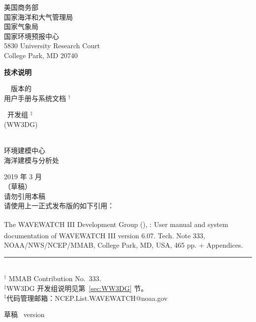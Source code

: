 \pagestyle{empty}

\begin{center}
美国商务部 \\
国家海洋和大气管理局 \\
国家气象局 \\
国家环境预报中心 \\
5830 University Research Court \\
College Park, MD 20740


\vspace{15mm}

{\bf 技术说明}

\vspace{15mm}

{\large \ww\ \WWver\ 版本的 \\
用户手册与系统文档 $^\dag$} \\

\vspace{15mm}

\ww\ 开发组 $^\ddag$ \\
(WW3DG)\\
\strut \\
环境建模中心 \\
海洋建模与分析处

\vfill

2019 年 3 月 \\
（草稿） \\
\vspace{\baselineskip}
{\sc 请勿引用本稿} \\
请使用上一正式发布版的如下引用：
\end{center}
\noindent The WAVEWATCH III\textsuperscript{\textregistered} Development Group (), \citeyearpar{ww3man2019}: User manual and system documentation of  WAVEWATCH III\textsuperscript{\textregistered} version 6.07. Tech. Note 333, NOAA/NWS/NCEP/MMAB, College Park, MD, USA, 465 pp. + Appendices.

\vfill

\noindent \rule{140mm}{0.5mm} \\
{\small $^\dag$ MMAB Contribution No.~333. \\
$^\ddag$WW3DG 开发组说明见第~\ref{sec:WW3DG} 节。\\
$^\ddag$代码管理邮箱：NCEP.List.WAVEWATCH@noaa.gov}

\bpage

\pb

         {{\rm 草稿} \hspace{20.5mm} \ws\ version \WWver}
\pagestyle{myheadings}
\setcounter{page}{1}

\cftsetpnumwidth{3em}
\cftsetrmarg{4em}

\tableofcontents

\pb
\pagestyle{empty}
\bpagea

\pb
\pagestyle{myheadings}
